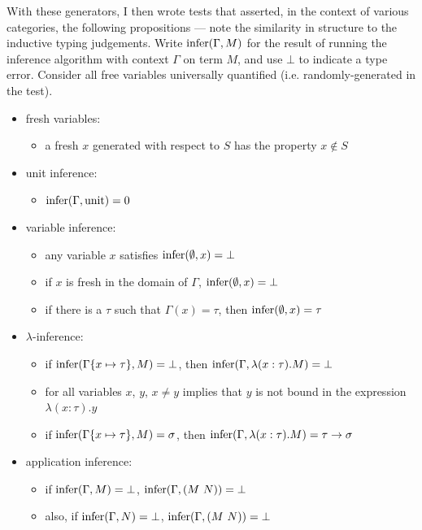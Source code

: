 With these generators, I then wrote tests that asserted, in the context of various categories, the following propositions --- note the similarity in structure to the inductive typing judgements.
Write \(\mathrm{infer}(\Gamma, M)\) for the result of running the inference algorithm with context \(\Gamma\) on term \(M\), and use \(\bot\) to indicate a type error.
Consider all free variables universally quantified (i.e. randomly-generated in the test).
\begin{itemize}
\item fresh variables:
\begin{itemize}
\item a fresh \(x\) generated with respect to \(S\) has the property \(x \notin S\)
\end{itemize}
\item unit inference:
\begin{itemize}
\item \(\mathrm{infer}(\Gamma, \mathrm{unit}) = 0\)
\end{itemize}
\item variable inference:
\begin{itemize}
\item any variable \(x\) satisfies \(\mathrm{infer}(\emptyset, x) = \bot\)
\item if \(x\) is fresh in the domain of \(\Gamma\), \(\mathrm{infer}(\emptyset, x) = \bot\)
\item if there is a \(\tau\) such that \(\Gamma(x) = \tau\), then \(\mathrm{infer}(\emptyset, x) = \tau\)
\end{itemize}
\item \(\lambda\)-inference:
\begin{itemize}
\item if \(\mathrm{infer}(\Gamma\{x \mapsto \tau\}, M) = \bot\), then \(\mathrm{infer}(\Gamma, \lambda (x : \tau). M) = \bot\)
\item for all variables \(x\), \(y\), \(x \neq y\) implies that \(y\) is not bound in the expression \(\lambda (x : \tau). y\)
\item if \(\mathrm{infer}(\Gamma\{x \mapsto \tau\}, M) = \sigma\), then \(\mathrm{infer}(\Gamma,\lambda (x : \tau). M) = \tau \to \sigma\)
\end{itemize}
\item application inference:
\begin{itemize}
\item if \(\mathrm{infer}(\Gamma, M) = \bot\), \(\mathrm{infer}(\Gamma, (M\ N)) = \bot\)
\item also, if \(\mathrm{infer}(\Gamma, N) = \bot\), \(\mathrm{infer}(\Gamma, (M\ N)) = \bot\)

\end{itemize}
\end{itemize}
